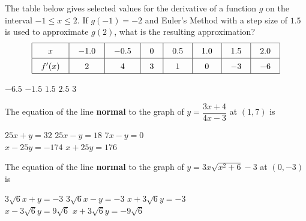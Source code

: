 \begin{questions}
    \question The table below gives selected values for the derivative of a function $g$ on the interval $-1 \leq x \leq 2$. If $g(-1) = -2$ and Euler's Method with a step size of $1.5$ is used to approximate $g(2)$, what is the resulting approximation? \begin{align*}
        \arraycolsep=11pt\def\arraystretch{1.5}
        \begin{array}{|c|c|c|c|c|c|c|c|}
            \hline
            x & -1.0 & -0.5 & 0 & 0.5 & 1.0 & 1.5 & 2.0 \\ \hline
            f'(x) & 2 & 4 & 3 & 1 & 0 & -3 & -6 \\
            \hline
        \end{array}
    \end{align*}

    \begin{oneparchoices}
        \choice $-6.5$
        \choice $-1.5$
        \choice $1.5$
        \choice $2.5$
        \choice $3$
    \end{oneparchoices} \par \horizontalline

    \question The equation of the line \textbf{normal} to the graph of $y = \dfrac{3x + 4}{4x - 3}$ at $(1, 7)$ is \\

    \begin{oneparchoices}
        \choice $25x + y = 32$ 
        \choice $25x - y = 18$
        \choice $7x - y = 0$ \\[11pt]
        \makebox[0.23\textwidth] \choice $x - 25y = -174$ 
        \makebox[0.23\textwidth] \choice $x + 25y = 176$
    \end{oneparchoices} \par \horizontalline

    \question The equation of the line \textbf{normal} to the graph of $y = 3x\sqrt{x^2 + 6} - 3$ at $(0, -3)$ is \\

    \begin{oneparchoices}
        \choice $3\sqrt{6}x + y = -3$
        \choice $3\sqrt{6}x - y = -3$
        \choice $x + 3\sqrt{6}y = -3$ \\[11pt]
        \makebox[0.19\textwidth] \choice $x - 3\sqrt{6}y = 9\sqrt{6}$
        \makebox[0.23\textwidth] \choice $x + 3\sqrt{6}y = -9\sqrt{6}$
    \end{oneparchoices} \par \horizontalline
\end{questions}